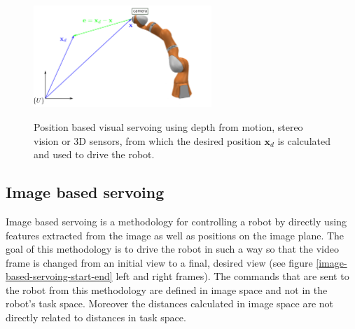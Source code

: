 \begin{center}
\begin{figure}[!htb]
\centering
\includegraphics[width=0.6\textwidth]{images/visual-servoing-position-based2.png}\\
\caption{Position based visual servoing using depth from motion, stereo vision or 3D sensors, from which the desired position $\mathbf{x}_d$ is calculated and 
used to drive the robot.}
\end{figure}
\end{center}

\subsection{Image based servoing}

Image based servoing is a methodology for controlling a robot by directly using features extracted from the image as well as positions on the image plane. The goal of this methodology is 
to drive the robot in such a way so that the video frame is changed from an initial view to a final, desired view (see figure \ref{image-based-servoing-start-end} left and right frames). The commands 
that are sent to the robot from this methodology are defined in image space and not in the robot's task space. Moreover the distances calculated in image space are not directly related to distances 
in task space.

